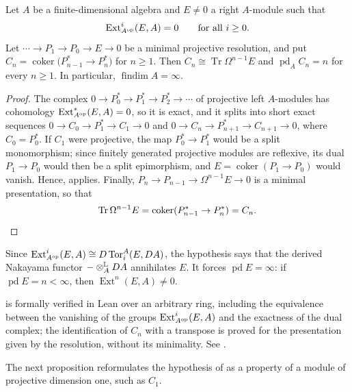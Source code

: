 \begin{theorem}
  \label{thm:strong-nakayama}
  Let $A$ be a finite-dimensional algebra and ${E\neq0}$ a right $A$-module
  such that
  \[
    \operatorname{Ext}^i_{A^{\mathrm{op}}}(E,A)=0\qquad\text{for all }i\geq0.
  \]
  Let ${\cdots\to P_1\to P_0\to E\to0}$ be a minimal projective resolution, and
  put ${C_n}={\operatorname{coker}(P_{n-1}^*}\to{ P_n^*)}$ for ${n\geq1}$. Then
  ${C_n\cong\operatorname{Tr}\Omega^{n-1}E}$ and ${\operatorname{pd}_AC_n=n}$ for
  every ${n\geq1}$. In particular, ${\operatorname{findim}A=\infty}$.
\end{theorem}

\begin{proof}
  The complex ${0\to P_0^*\to P_1^*\to P_2^*\to\cdots}$ of projective left
  $A$-modules has cohomology ${\operatorname{Ext}^*_{A^{\mathrm{op}}}(E,A)=0}$, so it is
  exact, and it splits into short exact sequences
  ${0\to C_0\to P_1^*\to C_1\to0}$ and ${0\to C_n\to P_{n+1}^*\to C_{n+1}\to0}$,
  where ${C_0=P_0^*}$. If $C_1$ were projective, the map ${P_0^*\to P_1^*}$ would be
  a split monomorphism; since finitely generated projective modules are
  reflexive, its dual ${P_1\to P_0}$ would then be a split epimorphism, and
  ${E=\operatorname{coker}(P_1\to P_0)}$ would vanish. Hence,
   applies. Finally,
  ${P_n\to P_{n-1}\to\Omega^{n-1}E\to0}$ is a minimal presentation, so that
  \[
    \operatorname{Tr}\Omega^{n-1}E=\operatorname{coker}(P_{n-1}^*\to P_n^*)
    =C_n.\qedhere
  \]
\end{proof}

Since ${\operatorname{Ext}^i_{A^{\mathrm{op}}}(E,A)\cong D\operatorname{Tor}^A_i(E,DA)}$,
the hypothesis says that the derived Nakayama functor ${-\Lotimes[A]DA}$
annihilates $E$. It forces ${\operatorname{pd}E=\infty}$: if
${\operatorname{pd}E=n<\infty}$, then ${\operatorname{Ext}^n(E,A)\neq0}$.

\begin{remark}
   is formally verified in Lean over an arbitrary
  ring, including the equivalence between the vanishing of the groups
  $\operatorname{Ext}^i_{A^{\mathrm{op}}}(E,A)$ and the exactness of the dual complex;
  the identification of $C_n$ with a transpose is proved for the presentation
  given by the resolution, without its minimality. See
  .
\end{remark}

The next proposition reformulates the hypothesis of 
as a property of a module of projective dimension one, such as $C_1$.

